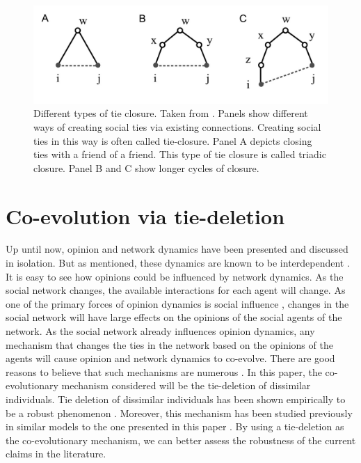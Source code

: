 \documentclass[11pt]{article}
\begin{document}
\begin{figure}[H]
   \centering
   \includegraphics[width=.8\linewidth]{../plots/references/kossinets_watts.jpeg}
 \caption{Different types of tie closure. Taken from \protect{}. Panels show different ways of creating social ties via existing connections. Creating social ties in this way is often called tie-closure. Panel A depicts closing ties with a friend of a friend. This type of tie closure is called triadic closure. Panel B and C show longer cycles of closure.}
 \label{fig:tie_closure}
\end{figure}

\section{Co-evolution via tie-deletion}
Up until now, opinion and network dynamics have been presented and discussed in isolation. But as mentioned, these dynamics are known to be interdependent \cite{bener_empirical_2016, kossinets_origins_2009, galesic_integrating_2021}.
It is easy to see how opinions could be influenced by network dynamics. 
As the social network changes, the available interactions for each agent will change. 
As one of the primary forces of opinion dynamics is social influence \cite{levin_dynamics_2021, chacoma_opinion_2015}, changes in the social network will have large effects on the opinions of the social agents of the network. 
As the social network already influences opinion dynamics, any mechanism that changes the ties in the network based on the opinions of the agents will cause opinion and network dynamics to co-evolve. 
There are good reasons to believe that such mechanisms are numerous \cite{bener_empirical_2016, kossinets_origins_2009, levin_dynamics_2021}.
In this paper, the co-evolutionary mechanism considered will be the tie-deletion of dissimilar individuals. 
Tie deletion of dissimilar individuals has been shown empirically to be a robust phenomenon \cite{kossinets_origins_2009, bener_empirical_2016}. Moreover, this mechanism has been studied previously in similar models to the one presented in this paper \cite{santos_cooperation_2006,sasahara_social_2021}. 
By using a tie-deletion as the co-evolutionary mechanism, we can better assess the robustness of the current claims in the literature. 
\end{document}
